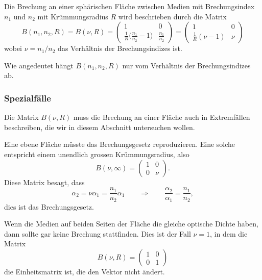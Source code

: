\begin{definition}
Die Brechung an einer sphärischen Fläche zwischen Medien mit Brechungsindex
$n_1$ und $n_2$ mit Krümmungsradius $R$ wird beschrieben durch die Matrix
\begin{equation}
B(n_1,n_2,R)
=
B(\nu,R)
=
\begin{pmatrix}
1&0\\
\displaystyle\frac{1}{R}\biggl(\frac{n_1}{n_2}-1\biggr)
	& \displaystyle\frac{n_1}{n_2}
\end{pmatrix}
=
\begin{pmatrix}
1                  & 0  \\
\frac{1}{R}(\nu-1) & \nu
\end{pmatrix}
\label{om:Bn1n2R}
\end{equation}
wobei $\nu = n_1/n_2$ das Verhältnis der Brechungsindizes ist.
\end{definition}

Wie angedeutet hängt $B(n_1,n_2,R)$ nur vom Verhältnis der Brechungsindizes ab.

\subsubsection{Spezialfälle}
Die Matrix $B(\nu,R)$ muss die Brechung an einer Fläche auch in Extremfällen
beschreiben, die wir in diesem Abschnitt untersuchen wollen.

Eine ebene Fläche müsste das Brechungsgesetz reproduzieren.
Eine solche entspricht einem unendlich grossen Krümmungsradius, also
\[
B(\nu,\infty)
=
\begin{pmatrix}
1&0\\0&\nu
\end{pmatrix}.
\]
Diese Matrix besagt, dass
\[
\alpha_2 = \nu \alpha_1 = \frac{n_1}{n_2}\alpha_1
\qquad\Rightarrow\qquad
\frac{\alpha_2}{\alpha_1}=\frac{n_1}{n_2},
\]
dies ist das Brechungsgesetz.

Wenn die Medien auf beiden Seiten der Fläche die gleiche optische
Dichte haben, dann sollte gar keine Brechung stattfinden.
Dies ist der Fall $\nu=1$, in dem die Matrix
\[
B(\nu,R)
=
\begin{pmatrix}
1&0\\
0&1
\end{pmatrix}
\]
die Einheitsmatrix ist, die den Vektor nicht ändert.

